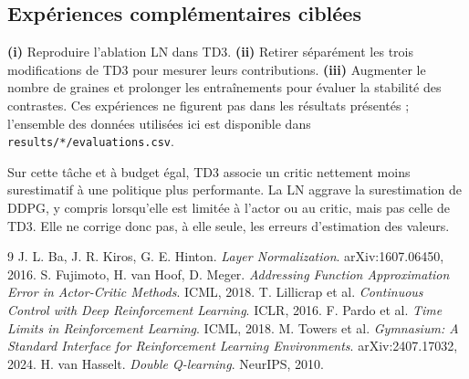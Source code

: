 \documentclass[10pt,a4paper]{article}
\begin{document}
\subsection{Expériences complémentaires ciblées}
\textbf{(i)} Reproduire l'ablation LN dans TD3. \textbf{(ii)} Retirer séparément les trois modifications de TD3 pour mesurer leurs contributions. \textbf{(iii)} Augmenter le nombre de graines et prolonger les entraînements pour évaluer la stabilité des contrastes. Ces expériences ne figurent pas dans les résultats présentés ; l'ensemble des données utilisées ici est disponible dans \texttt{results/*/evaluations.csv}.

\vspace{4pt}
\quad
Sur cette tâche et à budget égal, TD3 associe un critic nettement moins surestimatif à une politique plus performante. La LN aggrave la surestimation de DDPG, y compris lorsqu'elle est limitée à l'actor ou au critic, mais pas celle de TD3. Elle ne corrige donc pas, à elle seule, les erreurs d'estimation des valeurs.

\vspace{5pt}
\noindent{\color{rulegray}\rule{\linewidth}{.55pt}}
\vspace{-5pt}
{\footnotesize
\begin{english}\renewcommand{\refname}{Références}\begin{thebibliography}{9}\setlength{\itemsep}{0pt}\setlength{\parsep}{0pt}
 J. L. Ba, J. R. Kiros, G. E. Hinton. \emph{Layer Normalization}. arXiv:1607.06450, 2016.
 S. Fujimoto, H. van Hoof, D. Meger. \emph{Addressing Function Approximation Error in Actor-Critic Methods}. ICML, 2018.
 T. Lillicrap et al. \emph{Continuous Control with Deep Reinforcement Learning}. ICLR, 2016.
 F. Pardo et al. \emph{Time Limits in Reinforcement Learning}. ICML, 2018.
 M. Towers et al. \emph{Gymnasium: A Standard Interface for Reinforcement Learning Environments}. arXiv:2407.17032, 2024.
 H. van Hasselt. \emph{Double Q-learning}. NeurIPS, 2010.
\end{thebibliography}\end{english}
}
\endgroup
\end{document}
